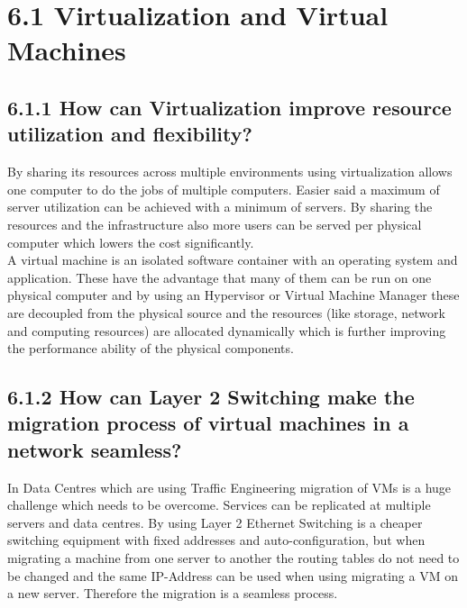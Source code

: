 \documentclass{article}
\begin{document}
	\pagestyle{fancy}
	\hfill
	
	\section*{6.1 Virtualization and Virtual Machines}
	\begin{adjustwidth}{2em}{2em}
		\subsection*{6.1.1 How can Virtualization improve resource utilization and flexibility?}
		\begin{adjustwidth}{2em}{2em}
			By sharing its resources across multiple environments using virtualization allows one computer to do the jobs of multiple computers. Easier said a maximum of server utilization can be achieved with a minimum of servers. By sharing the resources and the infrastructure also more users can be served per physical computer which lowers the cost significantly. \\
			A virtual machine is an isolated software container with an operating system and application. These have the advantage that many of them can be run on one physical computer and by using an Hypervisor or Virtual Machine Manager these are decoupled from the physical source and the resources (like storage, network and computing resources) are allocated dynamically which is further improving the performance ability of the physical components.
		\end{adjustwidth}
		\subsection*{6.1.2 How can Layer 2 Switching make the migration process of virtual machines in a network seamless?}
		\begin{adjustwidth}{2em}{2em}
			In Data Centres which are using Traffic Engineering migration of VMs is a huge challenge which needs to be overcome. Services can be replicated at multiple servers and data centres. By using Layer 2 Ethernet Switching  is a cheaper switching equipment with fixed addresses and auto-configuration, but when migrating a machine from one server to another the routing tables do not need to be changed and the same IP-Address can be used when using migrating a VM on a new server. Therefore the migration is a seamless process.
		\end{adjustwidth}
	\end{adjustwidth}
	
\end{document}
